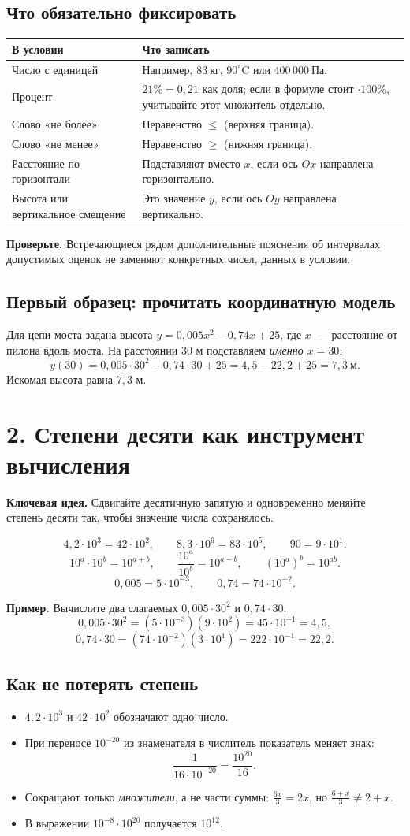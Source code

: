 \documentclass[a4paper,11pt]{article}
\newcommand{\topic}[1]{\section*{\textcolor{darkaccent}{#1}}}
\newcommand{\subtopic}[1]{\subsection*{\textcolor{accent}{#1}}}
\newcommand{\keyidea}[1]{\textcolor{darkaccent}{\textbf{Ключевая идея.}} #1}
\newcommand{\note}[1]{\textcolor{mute}{\textbf{Проверьте.}} #1}
\newcommand{\ex}[1]{\textbf{Пример.} #1}
\begin{document}
\subtopic{Что обязательно фиксировать}
\begin{center}
\begin{tabularx}{\linewidth}{@{}p{.28\linewidth}X@{}}
\toprule
\textbf{В условии} & \textbf{Что записать}\\
\midrule
Число с единицей & Например, $83\ \text{кг}$, $90^\circ\!\text{C}$ или $400\,000\ \text{Па}$.\\
Процент & $21\%=0{,}21$ как доля; если в формуле стоит $\cdot100\%$, учитывайте этот множитель отдельно.\\
Слово «не более» & Неравенство $\le$ (верхняя граница).\\
Слово «не менее» & Неравенство $\ge$ (нижняя граница).\\
Расстояние по горизонтали & Подставляют вместо $x$, если ось $Ox$ направлена горизонтально.\\
Высота или вертикальное смещение & Это значение $y$, если ось $Oy$ направлена вертикально.\\
\bottomrule
\end{tabularx}
\end{center}

\note{Встречающиеся рядом дополнительные пояснения об интервалах допустимых оценок не заменяют конкретных чисел, данных в условии.}

\subtopic{Первый образец: прочитать координатную модель}
Для цепи моста задана высота $y=0{,}005x^2-0{,}74x+25$, где $x$~--- расстояние от пилона вдоль моста. На расстоянии $30$ м подставляем \emph{именно $x=30$}:
\[
y(30)=0{,}005\cdot30^2-0{,}74\cdot30+25
=4{,}5-22{,}2+25=7{,}3\ \text{м}.
\]
Искомая высота равна $7{,}3$ м.

\clearpage
\topic{2. Степени десяти как инструмент вычисления}

\keyidea{Сдвигайте десятичную запятую и одновременно меняйте степень десяти так, чтобы значение числа сохранялось.}

\[
4{,}2\cdot10^3=42\cdot10^2, \qquad
8{,}3\cdot10^6=83\cdot10^5,
\qquad 90=9\cdot10^1.
\]
\[
10^a\cdot10^b=10^{a+b}, \qquad
\frac{10^a}{10^b}=10^{a-b},\qquad
(10^a)^b=10^{ab}.
\]
\[
0{,}005=5\cdot10^{-3},\qquad
0{,}74=74\cdot10^{-2}.
\]

\ex{Вычислите два слагаемых $0{,}005\cdot30^2$ и $0{,}74\cdot30$.}
\[
0{,}005\cdot30^2=(5\cdot10^{-3})(9\cdot10^2)
=45\cdot10^{-1}=4{,}5,
\]
\[
0{,}74\cdot30=(74\cdot10^{-2})(3\cdot10^1)
=222\cdot10^{-1}=22{,}2.
\]

\subtopic{Как не потерять степень}
\begin{itemize}[leftmargin=*,itemsep=.25em]
\item $4{,}2\cdot10^3$ и $42\cdot10^2$ обозначают одно число.
\item При переносе $10^{-20}$ из знаменателя в числитель показатель меняет знак:
\[
\frac{1}{16\cdot10^{-20}}=\frac{10^{20}}{16}.
\]
\item Сокращают только \emph{множители}, а не части суммы: $\frac{6x}{3}=2x$, но $\frac{6+x}{3}\ne2+x$.
\item В выражении $10^{-8}\cdot10^{20}$ получается $10^{12}$.
\end{itemize}
\end{document}
